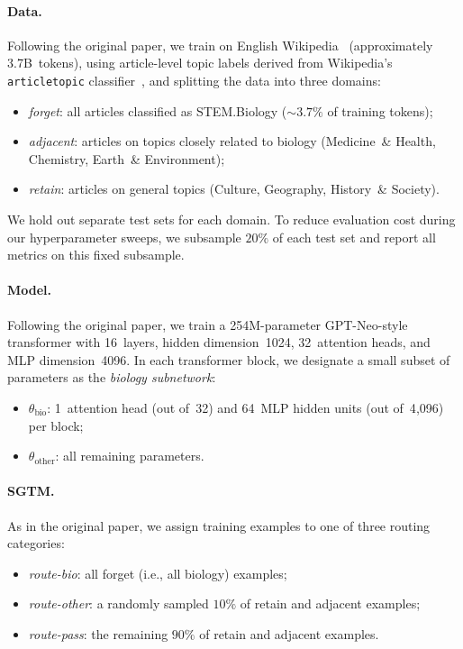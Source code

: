 \documentclass{article} %
\begin{document}

\paragraph{Data.}
Following the original paper, we train on English Wikipedia~\citep{wikidump} (approximately 3.7B~tokens), using article-level topic labels derived from Wikipedia's \texttt{articletopic} classifier~\citep{wikimedia_ores_articletopic}, and splitting the data into three domains:
\begin{itemize}
  \item \emph{forget}: all articles classified as STEM.Biology (${\sim}3.7\%$ of training tokens);
  \item \emph{adjacent}: articles on topics closely related to biology (Medicine~\& Health, Chemistry, Earth~\& Environment);
  \item \emph{retain}: articles on general topics (Culture, Geography, History~\& Society).
\end{itemize}
We hold out separate test sets for each domain.
To reduce evaluation cost during our hyperparameter sweeps, we subsample $20\%$ of each test set and report all metrics on this fixed subsample.


\paragraph{Model.}
Following the original paper, we train a 254M-parameter GPT-Neo-style transformer with 16~layers, hidden dimension~1024, 32~attention heads, and MLP dimension~4096.
In each transformer block, we designate a small subset of parameters as the \emph{biology subnetwork}:
%
\begin{itemize}
  \item $\theta_\text{bio}$: 1~attention head (out of~32) and 64~MLP hidden units (out of~4{,}096) per block;
  \item $\theta_\text{other}$: all remaining parameters.
\end{itemize}


\paragraph{SGTM.}
As in the original paper, we assign training examples to one of three routing categories:
\begin{itemize}
  \item \emph{route-bio}: all forget (i.e., all biology) examples;
  \item \emph{route-other}: a randomly sampled $10\%$ of retain and adjacent examples;
  \item \emph{route-pass}: the remaining $90\%$ of retain and adjacent examples.
\end{itemize}
\end{document}
